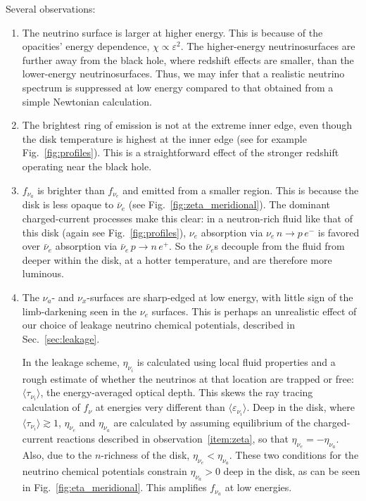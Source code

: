 Several observations:
\begin{enumerate}
  \item The neutrino surface is larger at higher energy.
    This is because of the opacities' energy dependence,
    $\chi\propto\varepsilon^2$. The higher-energy neutrinosurfaces are further
    away from the black hole, where redshift effects are smaller, than the
    lower-energy neutrinosurfaces. Thus, we may infer that a realistic neutrino
    spectrum is suppressed at low energy compared to that obtained from a
    simple Newtonian calculation.
  \item The brightest ring of emission is not at the extreme inner edge, even
    though the disk temperature is highest at the inner
    edge (see for example Fig.~\ref{fig:profiles}). This is a straightforward
    effect of the stronger redshift operating near the black hole.
  \item $f_{\nu_a}$ is brighter than $f_{\nu_e}$
    and emitted from a smaller region.
    \label{item:zeta}
    This is because the disk is less opaque
    to $\bar{\nu}_e$ (see Fig.~\ref{fig:zeta_meridional}). The dominant
    charged-current processes make this clear: in a neutron-rich fluid like that
    of this disk (again see Fig.~\ref{fig:profiles}), $\nu_e$ absorption via
    $\nu_e\,n \rightarrow p\,e^{-}$
    is favored over $\bar{\nu}_e$ absorption via
    $\bar{\nu}_e\,p \rightarrow n\,e^{+}$.
    So the $\bar{\nu}_e$s decouple from the fluid from deeper within the disk,
    at a hotter temperature, and are therefore more luminous.
  \item The $\nu_a$- and $\nu_x$-surfaces are sharp-edged at low energy,
    with little sign of the limb-darkening seen in the $\nu_e$ surfaces.
    \label{item:eta}
    This is perhaps an unrealistic effect of our choice of leakage neutrino
    chemical potentials, described in Sec.~\ref{sec:leakage}.

    In the leakage scheme, $\eta_{\nu_i}$ is calculated using local fluid
    properties and a rough estimate of whether the neutrinos at that location are
    trapped or free: $\langle \tau_{\nu_i} \rangle$, the energy-averaged optical
    depth.
    This skews the ray tracing calculation of $f_\nu$ at energies very different
    than $\langle \varepsilon_{\nu_i} \rangle$.
    Deep in the disk, where $\langle \tau_{\nu_i} \rangle \gtrsim 1$,
    $\eta_{\nu_e}$ and $\eta_{\nu_a}$ are calculated by assuming equilibrium
    of the charged-current reactions described in observation~\ref{item:zeta},
    so that $\eta_{\nu_e}=-\eta_{\nu_a}$.
    Also, due to the $n$-richness of the disk, $\eta_{\nu_e}<\eta_{\nu_a}$.
    These two conditions for the neutrino chemical potentials constrain
    $\eta_{\nu_a}>0$ deep in the disk, as can be seen in
    Fig.~\ref{fig:eta_meridional}.
    This amplifies $f_{\nu_a}$ at low energies.


\end{enumerate}
